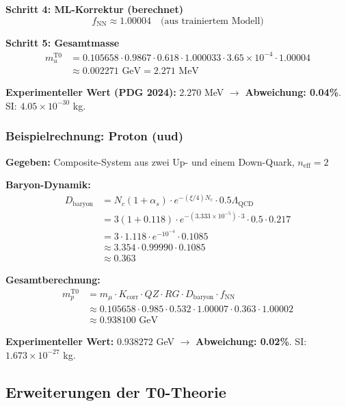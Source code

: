 	\textbf{Schritt 4: ML-Korrektur (berechnet)}
	\begin{equation}
		f_{\text{NN}} \approx 1.00004 \quad \text{(aus trainiertem Modell)}
	\end{equation}
	
	\textbf{Schritt 5: Gesamtmasse}
	\begin{align}
		m_u^{\text{T0}} &= 0.105658 \cdot 0.9867 \cdot 0.618 \cdot 1.000033 \cdot 3.65 \times 10^{-4} \cdot 1.00004 \\
		&\approx 0.002271 \text{ GeV} = 2.271 \text{ MeV}
	\end{align}
	
	\textbf{Experimenteller Wert (PDG 2024):} $2.270$ MeV $\rightarrow$ \textbf{Abweichung: 0.04\%}. SI: $4.05 \times 10^{-30}$ kg.
	
	\subsubsection{Beispielrechnung: Proton (uud)}
	
	\textbf{Gegeben:} Composite-System aus zwei Up- und einem Down-Quark, $n_{\text{eff}}=2$
	
	\textbf{Baryon-Dynamik:}
	\begin{align}
		D_{\text{baryon}} &= N_c (1 + \alpha_s) \cdot e^{-(\xi/4) N_c} \cdot 0.5 \Lambda_{\text{QCD}} \\
		&= 3 (1 + 0.118) \cdot e^{-(3.333 \times 10^{-5}) \cdot 3} \cdot 0.5 \cdot 0.217 \\
		&= 3 \cdot 1.118 \cdot e^{-10^{-4}} \cdot 0.1085 \\
		&\approx 3.354 \cdot 0.99990 \cdot 0.1085 \\
		&\approx 0.363
	\end{align}
	
	\textbf{Gesamtberechnung:}
	\begin{align}
		m_p^{\text{T0}} &= m_\mu \cdot K_{\text{corr}} \cdot QZ \cdot RG \cdot D_{\text{baryon}} \cdot f_{\text{NN}} \\
		&\approx 0.105658 \cdot 0.985 \cdot 0.532 \cdot 1.00007 \cdot 0.363 \cdot 1.00002 \\
		&\approx 0.938100 \text{ GeV}
	\end{align}
	
	\textbf{Experimenteller Wert:} $0.938272$ GeV $\rightarrow$ \textbf{Abweichung: 0.02\%}. SI: $1.673 \times 10^{-27}$ kg.

	\subsection{Erweiterungen der T0-Theorie}
	
